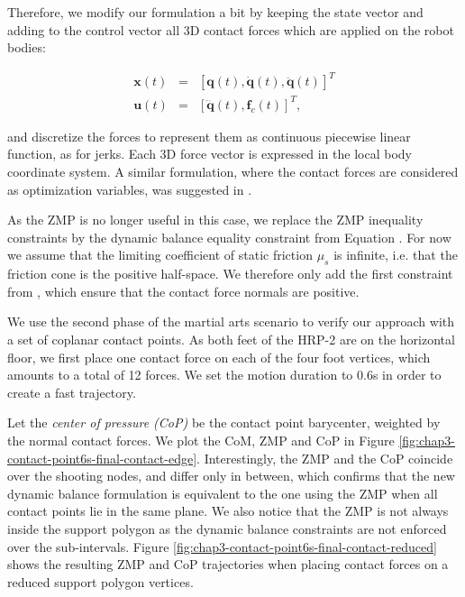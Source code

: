 Therefore, we modify our formulation a bit by keeping the state vector
and adding to the control vector all 3D contact forces which are
applied on the robot bodies:

\begin{equation}
  \begin{array}{rcl}
  \mathbf{x}(t) & = & [\mathbf{q}(t), \mathbf{\dot{q}}(t), \mathbf{\ddot{q}}(t)]^T \\
  \mathbf{u}(t) & = & [\mathbf{\dddot{q}}(t), \mathbf{f}_c(t)]^T,
  \end{array}
  \label{variables-contact-point}
\end{equation}

and discretize the forces to represent them as continuous piecewise
linear function, as for jerks. Each 3D force vector is expressed in
the local body coordinate system. A similar formulation, where the
contact forces are considered as optimization variables, was suggested
in \cite{saab-tro-12}.

As the ZMP is no longer useful in this case, we replace the ZMP
inequality constraints by the dynamic balance equality constraint from
Equation . For now we assume
that the limiting coefficient of static friction $\mu_s$ is infinite,
i.e. that the friction cone is the positive half-space. We therefore
only add the first constraint from , which
ensure that the contact force normals are positive.

We use the second phase of the martial arts scenario to verify our
approach with a set of coplanar contact points. As both feet of the
HRP-2 are on the horizontal floor, we first place one contact force on
each of the four foot vertices, which amounts to a total of 12
forces. We set the motion duration to $0.6$s in order to create a fast
trajectory.

Let the \emph{center of pressure (CoP)} be the contact point
barycenter, weighted by the normal contact forces. We plot the CoM,
ZMP and CoP in Figure
\ref{fig:chap3-contact-point6s-final-contact-edge}. Interestingly, the
ZMP and the CoP coincide over the shooting nodes, and differ only in
between, which confirms that the new dynamic balance formulation is
equivalent to the one using the ZMP when all contact points lie in the
same plane. We also notice that the ZMP is not always inside the support
polygon as the dynamic balance constraints are not enforced over the
sub-intervals. Figure
\ref{fig:chap3-contact-point6s-final-contact-reduced} shows the
resulting ZMP and CoP trajectories when placing contact forces on a
reduced support polygon vertices.

